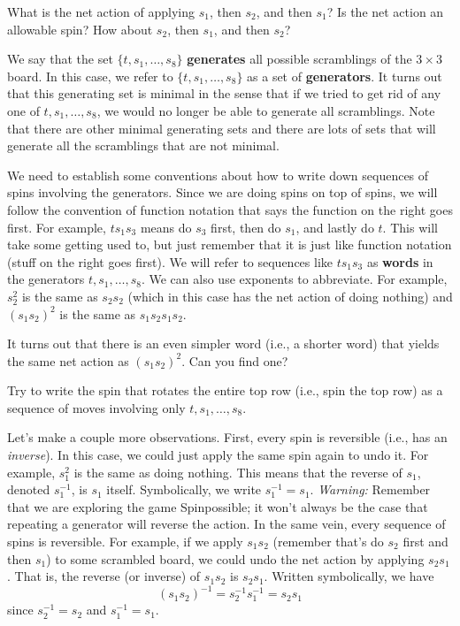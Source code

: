 \begin{exercise}
What is the net action of applying $s_1$, then $s_2$, and then $s_1$?  Is the net action an allowable spin?  How about $s_2$, then $s_1$, and then $s_2$?
\end{exercise}

We say that the set $\{t, s_1,\ldots,s_8\}$ \textbf{generates} all possible scramblings of the $3\times 3$ board. In this case, we refer to $\{t, s_1,\ldots,s_8\}$ as a set of \textbf{generators}. It turns out that this generating set is minimal in the sense that if we tried to get rid of any one of $t, s_1, \ldots, s_8$, we would no longer be able to generate all scramblings.  Note that there are other minimal generating sets and there are lots of sets that will generate all the scramblings that are not minimal.

We need to establish some conventions about how to write down sequences of spins involving the generators.  Since we are doing spins on top of spins, we will follow the convention of function notation that says the function on the right goes first.  For example, $ts_1 s_3$ means do $s_3$ first, then do $s_1$, and lastly do $t$.  This will take some getting used to, but just remember that it is just like function notation (stuff on the right goes first).  We will refer to sequences like $ts_1 s_3$ as \textbf{words} in the generators $t,s_1,\ldots, s_8$. We can also use exponents to abbreviate.  For example, $s_2^2$ is the same as $s_2 s_2$ (which in this case has the net action of doing nothing) and $(s_1 s_2)^2$ is the same as $s_1 s_2 s_1 s_2$.

\begin{exercise}
It turns out that there is an even simpler word (i.e., a shorter word) that yields the same net action as $(s_1 s_2)^2$. Can you find one?
\end{exercise}

\begin{exercise}
Try to write the spin that rotates the entire top row (i.e., spin the top row) as a sequence of moves involving only $t, s_1, \ldots, s_8$.
\end{exercise}

Let's make a couple more observations.  First, every spin is reversible (i.e., has an \emph{inverse}).  In this case, we could just apply the same spin again to undo it.  For example, $s_1^2$ is the same as doing nothing. This means that the reverse of $s_1$, denoted $s_1^{-1}$, is $s_1$ itself. Symbolically, we write $s_1^{-1}=s_1$.  \emph{Warning:} Remember that we are exploring the game Spinpossible; it won't always be the case that repeating a generator will reverse the action. In the same vein, every sequence of spins is reversible. For example, if we apply $s_1 s_2$ (remember that's do $s_2$ first and then $s_1$) to some scrambled board, we could undo the net action by applying $s_2 s_1$.  That is, the reverse (or inverse) of $s_1 s_2$ is $s_2 s_1$. Written symbolically, we have
\[
(s_1 s_2)^{-1}=s_2^{-1} s_1^{-1}=s_2 s_1
\]
since $s_2^{-1}=s_2$ and $s_1^{-1}=s_1$.


